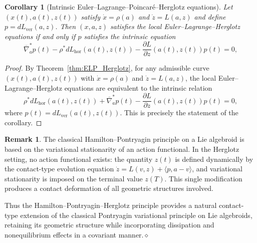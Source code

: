 \documentclass[11pt,a4paper]{article}
\newtheorem{corollary}[theorem]{Corollary}
\theoremstyle{definition}
\newtheorem{remark}[theorem]{Remark}
\begin{document}
\begin{corollary}[Intrinsic Euler--Lagrange--Poincar\'e--Herglotz equations]
\label{cor:ELP_Herglotz_clean}
Let $(x(t),a(t),z(t))$ satisfy $\dot x=\rho(a)$ and $\dot z=L(a,z)$ and
define $p=dL_{\mathrm{ver}}(a,z)$.  
Then $(x,a,z)$ satisfies the local Euler--Lagrange--Herglotz equations
if and only if $p$ satisfies the intrinsic equation
\begin{equation}\label{eq:ELP_Herglotz_connection}
\overline{\nabla}_{a}^{*}p (t) - \rho^{*}dL_{\mathrm{hor}}(a(t),z(t)) - \frac{\partial L}{\partial z}(a(t),z(t)) p(t) = 0,
\end{equation}
\end{corollary}

\begin{proof}
By Theorem~\ref{thm:ELP_Herglotz}, for any admissible curve
$(x(t),a(t),z(t))$ with $\dot x=\rho(a)$ and $\dot z=L(a,z)$, the local
Euler--Lagrange--Herglotz equations are equivalent to the intrinsic
relation
\[
\rho^{*}dL_{\mathrm{hor}}(a(t),z(t)) + \overline{\nabla}_{a}^{*}p (t) - \frac{\partial L}{\partial z}(a(t),z(t)) p(t) = 0,
\]
where $p(t)=dL_{\mathrm{ver}}(a(t),z(t))$.
This is precisely the statement of the corollary.
\end{proof}


\begin{remark}
The classical Hamilton--Pontryagin principle on a Lie algebroid
\cite{li2017lagrangian} is based on the variational stationarity of an
action functional.  In the Herglotz setting, no action functional exists:
the quantity $z(t)$ is defined dynamically by the contact-type evolution
equation $\dot z = L(v,z) + \langle p,a-v\rangle$, and variational
stationarity is imposed on the terminal value $z(T)$.
This single modification produces a contact deformation of all geometric
structures involved. 


Thus the Hamilton--Pontryagin--Herglotz principle provides a natural
contact-type extension of the classical Pontryagin variational principle
on Lie algebroids, retaining its geometric structure while incorporating
dissipation and nonequilibrium effects in a covariant manner.\hfill$\diamond$
\end{remark}
\end{document}
